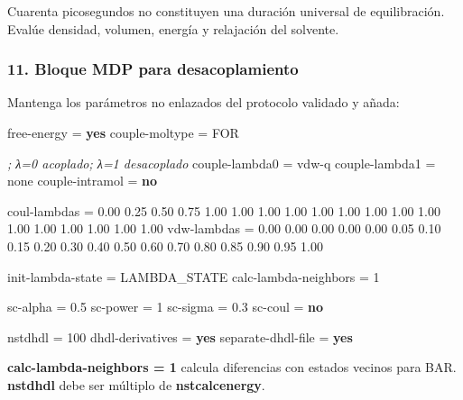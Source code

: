 \documentclass[
  spanish,
  11pt,
  a4paper]{article}
\newenvironment{Shaded}{\begin{snugshade}}{\end{snugshade}}
\newcommand{\CommentTok}[1]{\textcolor[rgb]{0.56,0.35,0.01}{\textit{#1}}}
\newcommand{\DataTypeTok}[1]{\textcolor[rgb]{0.13,0.29,0.53}{#1}}
\newcommand{\DecValTok}[1]{\textcolor[rgb]{0.00,0.00,0.81}{#1}}
\newcommand{\FloatTok}[1]{\textcolor[rgb]{0.00,0.00,0.81}{#1}}
\newcommand{\KeywordTok}[1]{\textcolor[rgb]{0.13,0.29,0.53}{\textbf{#1}}}
\newcommand{\OtherTok}[1]{\textcolor[rgb]{0.56,0.35,0.01}{#1}}
\newcommand{\StringTok}[1]{\textcolor[rgb]{0.31,0.60,0.02}{#1}}
\newcounter{none} %
\begin{document}
Cuarenta picosegundos no constituyen una duración universal de
equilibración. Evalúe densidad, volumen, energía y relajación del
solvente.

\subsubsection{11. Bloque MDP para
desacoplamiento}\label{bloque-mdp-para-desacoplamiento}

Mantenga los parámetros no enlazados del protocolo validado y añada:

\begin{Shaded}
\begin{Highlighting}[]
\DataTypeTok{free{-}energy            }\OtherTok{=}\StringTok{ }\KeywordTok{yes}
\DataTypeTok{couple{-}moltype         }\OtherTok{=}\StringTok{ FOR}

\CommentTok{; λ=0 acoplado; λ=1 desacoplado}
\DataTypeTok{couple{-}lambda0         }\OtherTok{=}\StringTok{ vdw{-}q}
\DataTypeTok{couple{-}lambda1         }\OtherTok{=}\StringTok{ none}
\DataTypeTok{couple{-}intramol        }\OtherTok{=}\StringTok{ }\KeywordTok{no}

\DataTypeTok{coul{-}lambdas }\OtherTok{=}\StringTok{ 0.00 0.25 0.50 0.75 1.00 1.00 1.00 1.00 1.00 1.00 1.00 1.00 1.00 1.00 1.00 1.00 1.00 1.00 1.00}
\DataTypeTok{vdw{-}lambdas  }\OtherTok{=}\StringTok{ 0.00 0.00 0.00 0.00 0.00 0.05 0.10 0.15 0.20 0.30 0.40 0.50 0.60 0.70 0.80 0.85 0.90 0.95 1.00}

\DataTypeTok{init{-}lambda{-}state      }\OtherTok{=}\StringTok{ LAMBDA\_STATE}
\DataTypeTok{calc{-}lambda{-}neighbors  }\OtherTok{=}\StringTok{ }\DecValTok{1}

\DataTypeTok{sc{-}alpha               }\OtherTok{=}\StringTok{ }\FloatTok{0.5}
\DataTypeTok{sc{-}power               }\OtherTok{=}\StringTok{ }\DecValTok{1}
\DataTypeTok{sc{-}sigma               }\OtherTok{=}\StringTok{ }\FloatTok{0.3}
\DataTypeTok{sc{-}coul                }\OtherTok{=}\StringTok{ }\KeywordTok{no}

\DataTypeTok{nstdhdl                }\OtherTok{=}\StringTok{ }\DecValTok{100}
\DataTypeTok{dhdl{-}derivatives       }\OtherTok{=}\StringTok{ }\KeywordTok{yes}
\DataTypeTok{separate{-}dhdl{-}file     }\OtherTok{=}\StringTok{ }\KeywordTok{yes}
\end{Highlighting}
\end{Shaded}

\textbf{calc-lambda-neighbors = 1} calcula diferencias con estados
vecinos para BAR. \textbf{nstdhdl} debe ser múltiplo de
\textbf{nstcalcenergy}.
\end{document}
